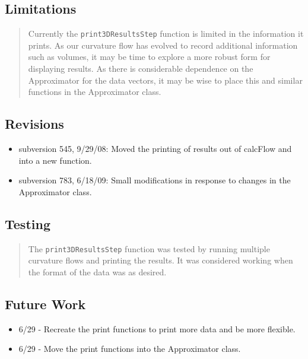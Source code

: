 \documentclass[10pt]{article}%
\begin{document}
\subsection*{Limitations}

\begin{quotation} Currently the \texttt{print3DResultsStep} function is limited in the information it prints. As our curvature flow has evolved to record additional information such as volumes, it may be time to explore a more robust form for displaying results. As there is considerable dependence on the Approximator for the data vectors, it may be wise to place this and similar functions in the Approximator class.\end{quotation}

\subsection*{Revisions}

\begin{itemize}\item  subversion 545, 9/29/08: Moved the printing of results out of calcFlow and into a new function.
\item  subversion 783, 6/18/09: Small modifications in response to changes in the Approximator class.
\end{itemize}

\subsection*{Testing}

\begin{quotation} The \texttt{print3DResultsStep} function was tested by running multiple curvature flows and printing the results. It was considered working when the format of the data was as desired.\end{quotation}

\subsection*{Future Work}

\begin{itemize}\item  6/29 - Recreate the print functions to print more data and be more flexible.
\item  6/29 - Move the print functions into the Approximator class.
\end{itemize}
    

%
\end{document}
